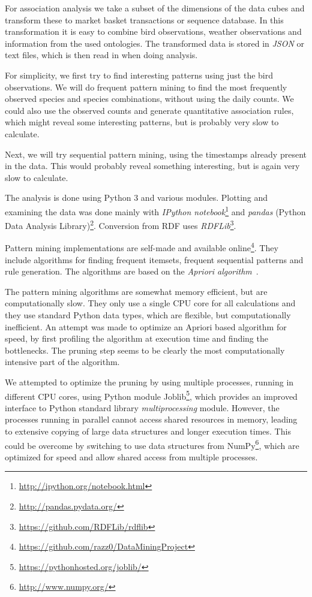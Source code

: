 \documentclass[english]{tktltiki2}
\begin{document}
For association analysis we take a subset of the dimensions of the data cubes and transform these to market basket transactions or sequence database. In this transformation it is easy to combine bird observations, weather observations and information from the used ontologies. The transformed data is stored in \emph{JSON} or text files, which is then read in when doing analysis.

For simplicity, we first try to find interesting patterns using just the bird observations. We will do frequent pattern mining to find the most frequently observed species and species combinations, without using the daily counts. We could also use the observed counts and generate quantitative association rules, which might reveal some interesting patterns, but is probably very slow to calculate.

Next, we will try sequential pattern mining, using the timestamps already present in the data. This would probably reveal something interesting, but is again very slow to calculate.

The analysis is done using Python 3 and various modules. Plotting and examining the data was done mainly with \emph{IPython notebook}\footnote{\url{http://ipython.org/notebook.html}} and \emph{pandas} (Python Data Analysis Library)\footnote{\url{http://pandas.pydata.org/}}. Conversion from RDF uses \emph{RDFLib}\footnote{\url{https://github.com/RDFLib/rdflib}}. 

Pattern mining implementations are self-made and available online\footnote{\url{https://github.com/razz0/DataMiningProject}}. They include algorithms for finding frequent itemsets, frequent sequential patterns and rule generation. The algorithms are based on the \emph{Apriori algorithm}~\cite{tan2006introduction}.

The pattern mining algorithms are somewhat memory efficient, but are computationally slow. They only use a single CPU core for all calculations and they use standard Python data types, which are flexible, but computationally inefficient. An attempt was made to optimize an Apriori based algorithm for speed, by first profiling the algorithm at execution time and finding the bottlenecks. The pruning step seems to be clearly the most computationally intensive part of the algorithm. %

We attempted to optimize the pruning by using multiple processes, running in different CPU cores, using Python module Joblib\footnote{\url{https://pythonhosted.org/joblib/}}, which provides an improved interface to Python standard library \emph{multiprocessing} module. However, the processes running in parallel cannot access shared resources in memory, leading to extensive copying of large data structures and longer execution times. This could be overcome by switching to use data structures from NumPy\footnote{\url{http://www.numpy.org/}}, which are optimized for speed and allow shared access from multiple processes.
\end{document}
